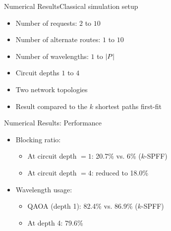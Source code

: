 \begin{frame}{Numerical Results}{Classical simulation setup}
    \begin{itemize}
        \item Number of requests: $2$ to $10$
        \item Number of alternate routes: $1$ to $10$
        \item Number of wavelengths: $1$ to $\lvert P\rvert$
        \item Circuit depths $1$ to $4$
        \item Two network topologies
        \item Result compared to the $k$ shortest paths first-fit
    \end{itemize}

\end{frame}


\begin{frame}{Numerical Results: Performance}
\begin{itemize}
    \item Blocking ratio:
    \begin{itemize}
        \item At circuit depth $=1$: 20.7\% vs. 6\% ($k$-SPFF)
        \item At circuit depth $=4$: reduced to 18.0\%
    \end{itemize}
    \item Wavelength usage:
    \begin{itemize}
        \item QAOA (depth 1): 82.4\% vs. 86.9\% ($k$-SPFF)
        \item At depth 4: 79.6\%
    \end{itemize}
\end{itemize}

\end{frame}


